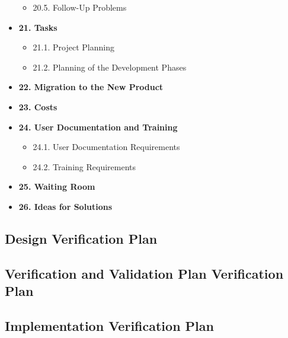 \documentclass[12pt, titlepage]{article}
\begin{document}
\begin{itemize}
\begin{itemize}
        \item 20.5. Follow-Up Problems
    \end{itemize}
    \item \textbf{21. Tasks}
    \begin{itemize}
        \item 21.1. Project Planning
        \item 21.2. Planning of the Development Phases
    \end{itemize}
    \item \textbf{22. Migration to the New Product}
    \item \textbf{23. Costs}
    \item \textbf{24. User Documentation and Training}
    \begin{itemize}
        \item 24.1. User Documentation Requirements
        \item 24.2. Training Requirements
    \end{itemize}
    \item \textbf{25. Waiting Room}
    \item \textbf{26. Ideas for Solutions}
\end{itemize}


\subsection{Design Verification Plan}




\subsection{Verification and Validation Plan Verification Plan}




\subsection{Implementation Verification Plan}
\end{document}
